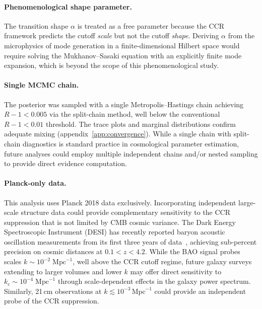 \paragraph{Phenomenological shape parameter.}
The transition shape $\alpha$ is treated as a free parameter because the
CCR framework predicts the cutoff \emph{scale} but not the cutoff
\emph{shape}.  Deriving $\alpha$ from the microphysics of mode
generation in a finite-dimensional Hilbert space would require solving
the Mukhanov--Sasaki equation with an explicitly finite mode expansion,
which is beyond the scope of this phenomenological study.

\paragraph{Single MCMC chain.} The posterior was sampled with a single 
Metropolis--Hastings chain achieving $R-1 < 0.005$ via the split-chain 
method, well below the conventional $R-1 < 0.01$ threshold. The trace plots
and marginal distributions confirm adequate mixing (appendix~\ref{app:convergence}). 
While a single chain with split-chain diagnostics is standard practice in 
cosmological parameter estimation, future analyses could employ multiple 
independent chains and/or nested sampling to provide direct evidence computation.

\paragraph{Planck-only data.}
This analysis uses Planck 2018 data exclusively.  Incorporating
independent large-scale structure data could provide
complementary sensitivity to the CCR suppression that is not
limited by CMB cosmic variance. The Dark Energy Spectroscopic
Instrument (DESI) has recently reported baryon acoustic
oscillation measurements from its first three years of
data~\cite{DESI:2024,DESI:2025}, achieving sub-percent
precision on cosmic distances at $0.1 < z < 4.2$. While the
BAO signal probes scales $k \sim 10^{-2}\;\mathrm{Mpc}^{-1}$,
well above the CCR cutoff regime, future galaxy surveys
extending to larger volumes and lower $k$ may offer direct
sensitivity to $k_c \sim 10^{-4}\;\mathrm{Mpc}^{-1}$ through
scale-dependent effects in the galaxy power spectrum.
Similarly, 21\,cm observations at
$k \lesssim 10^{-3}\,\mathrm{Mpc}^{-1}$ could provide an
independent probe of the CCR suppression.

